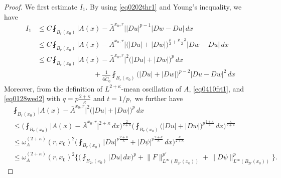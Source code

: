 \documentclass[reqno]{amsart}
\numberwithin{equation}{section}
\theoremstyle{plain}
\theoremstyle{definition}
\theoremstyle{remark}
\providecommand{\biggset}[1]{\biggl\{#1\biggr\}}
\providecommand{\abs}[1]{\lvert#1\rvert}
\providecommand{\norm}[1]{\lVert#1\rVert}
\begin{document}
\begin{proof}
We first estimate $I_1$. By using \eqref{eq0202thr1} and  Young's inequality,  we have
\begin{align*}
I_1&\leq C  \fint_{B_r(x_0)} \abs{ A(x) -\bar{A}^{x_0,r} } \abs{Du}^{p-1} \abs{Dw-Du} \,dx \\
 &\leq C  \fint_{B_r(x_0)} \abs{ A(x) -\bar{A}^{x_0,r} }  \big(  \abs{Du} +\abs{Dw} \big)^{\frac{p}{2} +\frac{p-2}{2}} \abs{Dw-Du}\, dx\\
 &\leq C  \fint_{B_r(x_0)} \abs{ A(x) -\bar{A}^{x_0,r} } ^2\big(  \abs{Du} +\abs{Dw} \big)^p \,dx \\
 &\qquad\qquad\qquad\qquad+ \frac{1}{6\tilde C_0} \fint_{B_r(x_0)} \big(  \abs{Du}+\abs{Dw} \big)^{p-2}\abs{Du-Dw}^2 \,dx
\end{align*}
Moreover, from the definition of $L^{2+\kappa}$-mean oscillation of $A$, \eqref{eq0410fri1}, and \eqref{eq0128wed2} with $q=p\frac{2+\kappa}{\kappa}$ and $t=1/p,$  we further have
\begin{align*}
& \fint_{B_r(x_0)} \abs{ A(x) -\bar{A}^{x_0,r} } ^2\big(  \abs{Du} +\abs{Dw} \big)^p \,dx\\ 
& \leq \bigg(  \fint_{B_r(x_0)} \abs{ A(x) -\bar{A}^{x_0,r} }^{2+\kappa} \, dx\bigg) ^\frac{2}{2+\kappa} \bigg(  \fint_{B_r(x_0)} \big(  \abs{Du} +\abs{Dw} \big)^{p\frac{2+\kappa}{  \kappa}}\,dx \bigg) ^\frac{ \kappa}{2+\kappa}\\
&\leq \omega^{(2+\kappa)}_A(r,x_0)^2  \bigg( \fint_{B_{r}(x_0)} \abs{Du}^{p\frac{2+\kappa}{ \kappa}} + \abs{D\psi}^{p\frac{2+\kappa}{\kappa}} \, dx \bigg)^{\frac{\kappa}{2+\kappa}}  \\
&\leq \omega^{(2+\kappa)}_A(r,x_0)^2 \biggset{  \bigg(\fint_{B_{2r}(x_0)}   \abs{Du}  \, dx\bigg)^p+  \norm{F}_{L^\infty(B_{2r}(x_0))}
^{p'}+\norm{D\psi}_{L^\infty(B_{2r}(x_0))}^p}.
\end{align*}


\end{proof}
\end{document}
